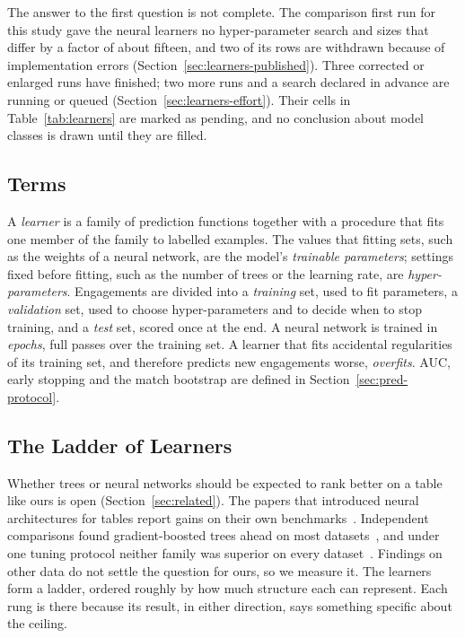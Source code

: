 The answer to the first question is not complete. The comparison first run for this study gave the
neural learners no hyper-parameter search and sizes that differ by a factor of about fifteen, and two of its
rows are withdrawn because of implementation errors (Section~\ref{sec:learners-published}). Three
corrected or enlarged runs have finished; two more runs and a search declared in advance are running or
queued (Section~\ref{sec:learners-effort}). Their cells in Table~\ref{tab:learners} are marked as pending, and no
conclusion about model classes is drawn until they are filled.

\subsection{Terms}
\label{sec:learners-terms}

A \emph{learner} is a family of prediction functions together with a procedure that fits one member of
the family to labelled examples. The values that fitting sets, such as the weights of a neural network,
are the model's \emph{trainable parameters}; settings fixed before fitting, such as the number of trees
or the learning rate, are \emph{hyper-parameters}. Engagements are divided into a \emph{training} set,
used to fit parameters, a \emph{validation} set, used to choose hyper-parameters and to decide when to
stop training, and a \emph{test} set, scored once at the end. A neural network is trained in
\emph{epochs}, full passes over the training set. A learner that fits accidental regularities of its
training set, and therefore predicts new engagements worse, \emph{overfits}. AUC, early stopping and the
match bootstrap are defined in Section~\ref{sec:pred-protocol}.

\subsection{The Ladder of Learners}
\label{sec:learners-ladder}

Whether trees or neural networks should be expected to rank better on a table like ours is open
(Section~\ref{sec:related}). The papers that introduced neural architectures for tables report gains on
their own benchmarks~\cite{arik2021tabnet,somepalli2021saint}. Independent comparisons found
gradient-boosted trees ahead on most datasets~\cite{shwartzziv2022tabular,grinsztajn2022tree}, and under
one tuning protocol neither family was superior on every dataset~\cite{gorishniy2021revisiting}.
Findings on other data do not settle the question for ours, so we measure it. The learners form a ladder,
ordered roughly by how much structure each can represent. Each rung is there because its result, in
either direction, says something specific about the ceiling.

